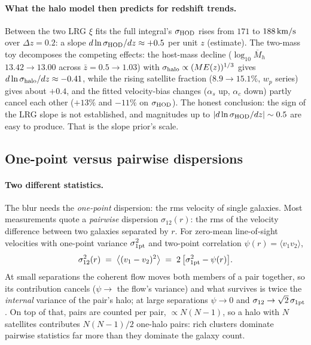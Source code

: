 \documentclass[11pt]{article}
\newcommand{\shod}{\sigma_{\rm HOD}}
\newcommand{\shalo}{\sigma_{\rm halo}}
\newcommand{\kms}{\,{\rm km/s}}
\begin{document}
\paragraph{What the halo model then predicts for redshift trends.}
Between the two LRG $\xi$ fits the full integral's $\shod$ rises from
$171$ to $188\kms$ over $\Delta z = 0.2$: a slope
$d\ln\shod/dz \approx +0.5$ per unit $z$ (estimate).  The two-mass
toy decomposes the competing effects: the host-mass decline
($\log_{10}\overline{M}_h$ $13.42 \to 13.00$ across
$\bar{z} = 0.5 \to 1.03$) with $\shalo \propto (M E(z))^{1/3}$ gives
$d\ln\shalo/dz \approx -0.41$, while the rising satellite fraction
($8.9 \to 15.1\%$, $w_p$ series) gives about $+0.4$, and the fitted
velocity-bias changes ($\alpha_s$ up, $\alpha_c$ down) partly cancel
each other ($+13\%$ and $-11\%$ on $\shod$).  The honest conclusion:
the sign of the LRG slope is not established, and magnitudes up to
$|d\ln\shod/dz| \sim 0.5$ are easy to produce.  That is the slope
prior's scale.

\subsection{One-point versus pairwise dispersions}
\label{sec:pairwise}

\paragraph{Two different statistics.}
The blur needs the \emph{one-point} dispersion: the rms velocity of
single galaxies.  Most measurements quote a \emph{pairwise}
dispersion $\sigma_{12}(r)$: the rms of the velocity difference
between two galaxies separated by $r$.  For zero-mean line-of-sight
velocities with one-point variance $\sigma_{\rm 1pt}^2$ and two-point
correlation $\psi(r) = \langle v_1 v_2\rangle$,
\begin{equation}
  \sigma_{12}^2(r) \;=\;
  \bigl\langle (v_1 - v_2)^2 \bigr\rangle
  \;=\; 2\,\bigl[\sigma_{\rm 1pt}^2 - \psi(r)\bigr] .
  \label{eq:pairwise}
\end{equation}
At small separations the coherent flow moves both members of a pair
together, so its contribution cancels ($\psi \to$ the flow's
variance) and what survives is twice the \emph{internal} variance of
the pair's halo; at large separations $\psi \to 0$ and
$\sigma_{12} \to \sqrt{2}\,\sigma_{\rm 1pt}$.  On top of that, pairs
are counted per pair, $\propto N(N-1)$, so a halo with $N$ satellites
contributes $N(N-1)/2$ one-halo pairs: rich clusters dominate
pairwise statistics far more than they dominate the galaxy count.
\end{document}

